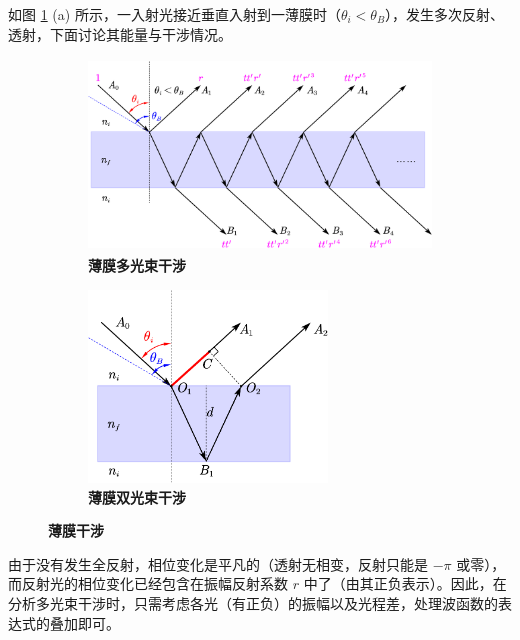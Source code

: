\documentclass[UTF8]{report}
\theoremstyle{MyLineTheoremStyle} %
\theoremstyle{MyBlockTheoremStyle} %
\theoremstyle{MySubsubsectionStyle} %
\begin{document}
如图 \ref{薄膜干涉} (a) 所示，一入射光接近垂直入射到一薄膜时（$\theta_i < \theta_B$），发生多次反射、透射，下面讨论其能量与干涉情况。

\begin{figure}[H]\centering
    \begin{subfigure}[t]{0.6\columnwidth}\centering
        \includegraphics[height=145pt]{assets/3/薄膜干涉.pdf}
        \caption{\bfseries 薄膜多光束干涉 }
    \end{subfigure}\hfill
    \begin{subfigure}[t]{0.4\columnwidth}\centering
        \includegraphics[height=145pt]{assets/3/薄膜双光束干涉.pdf}
        \caption{\bfseries 薄膜双光束干涉 }
    \end{subfigure}
    \caption{\bfseries 薄膜干涉 }\label{薄膜干涉}
\end{figure}

由于没有发生全反射，相位变化是平凡的（透射无相变，反射只能是 $-\pi$ 或零），而反射光的相位变化已经包含在振幅反射系数 $r$ 中了（由其正负表示）。因此，在分析多光束干涉时，只需考虑各光（有正负）的振幅以及光程差，处理波函数的表达式的叠加即可。
\end{document}

